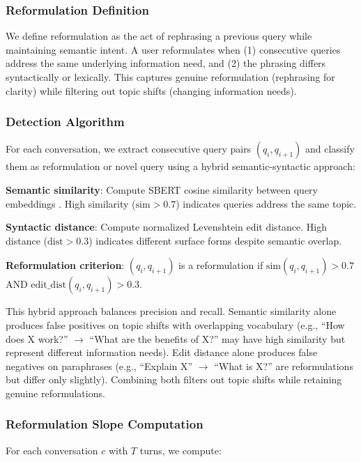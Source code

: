 \subsubsection{Reformulation Definition}

We define reformulation as the act of rephrasing a previous query while maintaining semantic intent. A user reformulates when (1) consecutive queries address the same underlying information need, and (2) the phrasing differs syntactically or lexically. This captures genuine reformulation (rephrasing for clarity) while filtering out topic shifts (changing information needs).

\subsubsection{Detection Algorithm}

For each conversation, we extract consecutive query pairs $(q_i, q_{i+1})$ and classify them as reformulation or novel query using a hybrid semantic-syntactic approach:

\textbf{Semantic similarity}: Compute SBERT cosine similarity between query embeddings \cite{reimers2019sentence}. High similarity ($\text{sim} > 0.7$) indicates queries address the same topic.

\textbf{Syntactic distance}: Compute normalized Levenshtein edit distance. High distance ($\text{dist} > 0.3$) indicates different surface forms despite semantic overlap.

\textbf{Reformulation criterion}: $(q_i, q_{i+1})$ is a reformulation if $\text{sim}(q_i, q_{i+1}) > 0.7$ AND $\text{edit\_dist}(q_i, q_{i+1}) > 0.3$.

This hybrid approach balances precision and recall. Semantic similarity alone produces false positives on topic shifts with overlapping vocabulary (e.g., ``How does X work?'' $\rightarrow$ ``What are the benefits of X?'' may have high similarity but represent different information needs). Edit distance alone produces false negatives on paraphrases (e.g., ``Explain X'' $\rightarrow$ ``What is X?'' are reformulations but differ only slightly). Combining both filters out topic shifts while retaining genuine reformulations.

\subsubsection{Reformulation Slope Computation}

For each conversation $c$ with $T$ turns, we compute:

